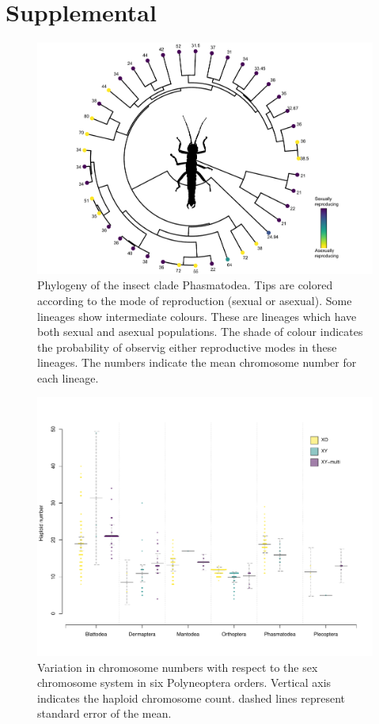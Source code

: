 \section{Supplemental}
\vfill

\setcounter{figure}{0}
\renewcommand{\thefigure}{S\arabic{figure}}
\setcounter{table}{0}
\renewcommand{\thetable}{S\arabic{table}}

\newpage
\begin{figure}
\centering \includegraphics[width=1\textwidth]{figures/phasmatodea_phylogeny.pdf}
\caption{Phylogeny of the insect clade Phasmatodea. Tips are colored according to the mode of reproduction (sexual or asexual). Some lineages show intermediate colours. These are lineages which have both sexual and asexual populations. The shade of colour indicates the probability of observig either reproductive modes in these lineages. The numbers indicate the mean chromosome number for each lineage.}
\label{fig:phas.phylo}
\end{figure}

\newpage
\begin{figure}
\centering \includegraphics[width=.7\textwidth]{figures/Preliminary_data.pdf}
\caption{
Variation in chromosome numbers with respect to the sex chromosome system in six Polyneoptera orders. Vertical axis indicates the haploid chromosome count. dashed lines represent standard error of the mean.
}
\label{fig:order.plots}
\end{figure}

